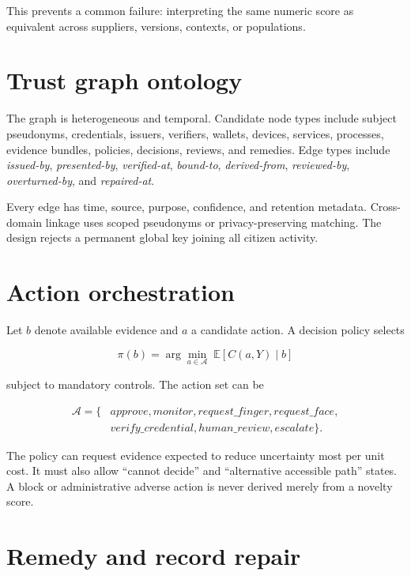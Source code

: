 This prevents a common failure: interpreting the same numeric score as equivalent across suppliers, versions, contexts, or populations.

\section{Trust graph ontology}

The graph is heterogeneous and temporal. Candidate node types include subject pseudonyms, credentials, issuers, verifiers, wallets, devices, services, processes, evidence bundles, policies, decisions, reviews, and remedies. Edge types include \emph{issued-by}, \emph{presented-by}, \emph{verified-at}, \emph{bound-to}, \emph{derived-from}, \emph{reviewed-by}, \emph{overturned-by}, and \emph{repaired-at}.

Every edge has time, source, purpose, confidence, and retention metadata. Cross-domain linkage uses scoped pseudonyms or privacy-preserving matching. The design rejects a permanent global key joining all citizen activity.

\section{Action orchestration}

Let $b$ denote available evidence and $a$ a candidate action. A decision policy selects

\begin{equation}
\pi(b)=\arg\min_{a\in\mathcal{A}}\; \mathbb{E}[C(a,Y)\mid b]
\end{equation}

subject to mandatory controls. The action set can be

\begin{equation}
\begin{split}
\mathcal{A}=\{&approve,monitor,request\_finger,request\_face,\\
              &verify\_credential,human\_review,escalate\}.
\end{split}
\end{equation}

The policy can request evidence expected to reduce uncertainty most per unit cost. It must also allow ``cannot decide'' and ``alternative accessible path'' states. A block or administrative adverse action is never derived merely from a novelty score.

\section{Remedy and record repair}

